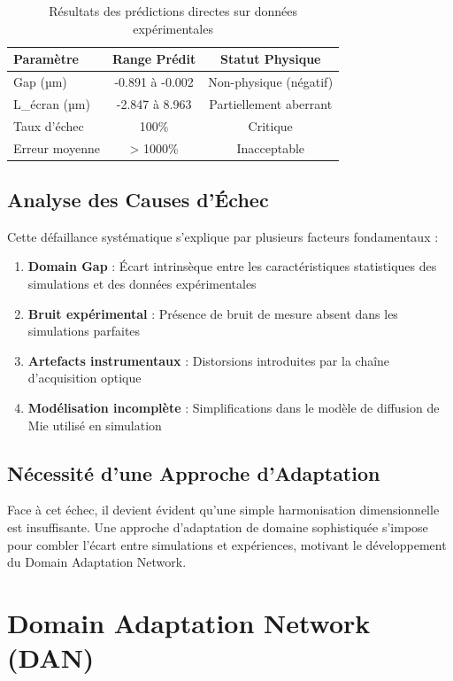\documentclass[twocolumn,10pt]{article}
\begin{document}
\begin{table}[H]
\centering
\caption{Résultats des prédictions directes sur données expérimentales}
\begin{tabular}{|l|c|c|}
\hline
\textbf{Paramètre} & \textbf{Range Prédit} & \textbf{Statut Physique} \\
\hline
Gap (µm) & -0.891 à -0.002 & Non-physique (négatif) \\
L\_écran (µm) & -2.847 à 8.963 & Partiellement aberrant \\
Taux d'échec & 100\% & Critique \\
Erreur moyenne & > 1000\% & Inacceptable \\
\hline
\end{tabular}
\end{table}

\subsection{Analyse des Causes d'Échec}

Cette défaillance systématique s'explique par plusieurs facteurs fondamentaux :

\begin{enumerate}
\item \textbf{Domain Gap} : Écart intrinsèque entre les caractéristiques statistiques des simulations et des données expérimentales
\item \textbf{Bruit expérimental} : Présence de bruit de mesure absent dans les simulations parfaites
\item \textbf{Artefacts instrumentaux} : Distorsions introduites par la chaîne d'acquisition optique
\item \textbf{Modélisation incomplète} : Simplifications dans le modèle de diffusion de Mie utilisé en simulation
\end{enumerate}

\subsection{Nécessité d'une Approche d'Adaptation}

Face à cet échec, il devient évident qu'une simple harmonisation dimensionnelle est insuffisante. Une approche d'adaptation de domaine sophistiquée s'impose pour combler l'écart entre simulations et expériences, motivant le développement du Domain Adaptation Network.

\section{Domain Adaptation Network (DAN)}
\end{document}
